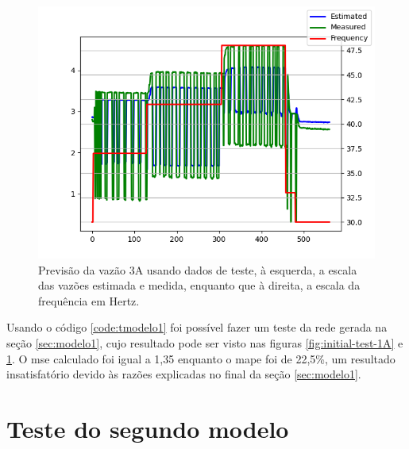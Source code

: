 \documentclass[12pt]{article}
\begin{document}
\begin{figure}
    \centering
    \includegraphics{results/initial-test-3A.png}
    \caption{Previsão da vazão 3A usando dados de teste, à esquerda, a escala das vazões estimada e medida, enquanto que à direita, a escala da frequência em Hertz.}
    \label{fig:initial-test-3A}
\end{figure}

Usando o código \ref{code:tmodelo1} foi possível fazer um teste da rede gerada na seção \ref{sec:modelo1}, cujo resultado pode ser visto nas figuras \ref{fig:initial-test-1A} e \ref{fig:initial-test-3A}. O \acrshort{mse} calculado foi igual a 1,35 enquanto o \acrshort{mape} foi de 22,5\%, um resultado insatisfatório devido às razões explicadas no final da seção \ref{sec:modelo1}.

\section{Teste do segundo modelo}


\end{document}
